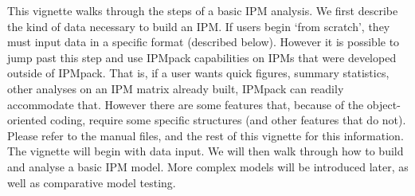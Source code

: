 \documentclass{article}
\begin{document}
This vignette walks through the steps of a basic IPM analysis. We first
describe the kind of data necessary to build an IPM.  If users begin `from
scratch', they must input data in a specific format (described below).  However
it is possible to jump past this step and use IPMpack capabilities on IPMs that
were developed outside of IPMpack. That is, if a user wants quick figures, summary statistics, other analyses on an IPM matrix already built, IPMpack can readily accommodate that.   However there are some features that, because of the object-oriented coding, require some specific structures (and other features that do not).  Please refer to the manual files, and the rest of this vignette for this information. The vignette will begin with data input.  We will then walk through how to build and analyse a basic IPM model.  More complex models will be introduced later, as well as comparative model testing.
\end{document}
